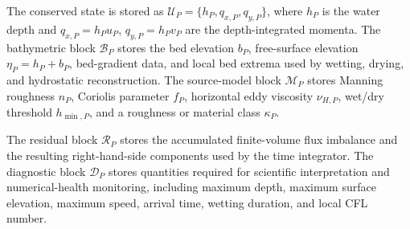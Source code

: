\documentclass[11pt]{article}
\begin{document}
The conserved state is stored as $\mathcal{U}_P = \{h_P,q_{x,P},q_{y,P}\}$, where $h_P$ is the water depth and $q_{x,P}=h_Pu_P$, $q_{y,P}=h_Pv_P$ are the depth-integrated momenta. The bathymetric block $\mathcal{B}_P$ stores the bed elevation $b_P$, free-surface elevation $\eta_P=h_P+b_P$, bed-gradient data, and local bed extrema used by wetting, drying, and hydrostatic reconstruction. The source-model block $\mathcal{M}_P$ stores Manning roughness $n_P$, Coriolis parameter $f_P$, horizontal eddy viscosity $\nu_{H,P}$, wet/dry threshold $h_{\min,P}$, and a roughness or material class $\kappa_P$.

The residual block $\mathcal{R}_P$ stores the accumulated finite-volume flux imbalance and the resulting right-hand-side components used by the time integrator. The diagnostic block $\mathcal{D}_P$ stores quantities required for scientific interpretation and numerical-health monitoring, including maximum depth, maximum surface elevation, maximum speed, arrival time, wetting duration, and local CFL number.



%
%
\end{document}
